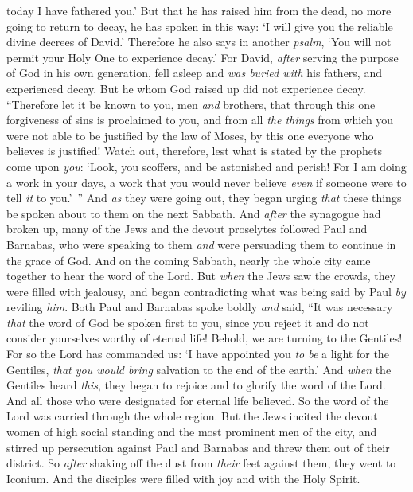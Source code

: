 \begin{biblechapter}
today I have fathered you.’
\verse But that he has raised him from the dead, no more going to return to decay, he has spoken in this way: ‘I will give you the reliable divine decrees of David.’
\verse Therefore he also says in another \textit{psalm}, ‘You will not permit your Holy One to experience decay.’
\verse For David, \textit{after} serving the purpose of God in his own generation, fell asleep and \textit{was buried with} his fathers, and experienced decay.
\verse But he whom God raised up did not experience decay.
\verse “Therefore let it be known to you, men \textit{and} brothers, that through this one forgiveness of sins is proclaimed to you, and from all \textit{the things} from which you were not able to be justified by the law of Moses,
\verse by this one everyone who believes is justified!
\verse Watch out, therefore, lest what is stated by the prophets come upon \textit{you}:
\verse ‘Look, you scoffers, 
and be astonished and perish! 
For I am doing a work in your days, 
a work that you would never believe 
\textit{even} if someone were to tell \textit{it} to you.’ ”
 And \textit{as} they were going out, they began urging \textit{that} these things be spoken about to them on the next Sabbath.
\verse And \textit{after} the synagogue had broken up, many of the Jews and the devout proselytes followed Paul and Barnabas, who were speaking to them \textit{and} were persuading them to continue in the grace of God.
\verse And on the coming Sabbath, nearly the whole city came together to hear the word of the Lord.
\verse But \textit{when} the Jews saw the crowds, they were filled with jealousy, and began contradicting what was being said by Paul \textit{by} reviling \textit{him}.
\verse Both Paul and Barnabas spoke boldly \textit{and} said, “It was necessary \textit{that} the word of God be spoken first to you, since you reject it and do not consider yourselves worthy of eternal life! Behold, we are turning to the Gentiles!
\verse For so the Lord has commanded us: ‘I have appointed you \textit{to be} a light for the Gentiles, 
\textit{that you would bring} salvation to the end of the earth.’
\verse And \textit{when} the Gentiles heard \textit{this}, they began to rejoice and to glorify the word of the Lord. And all those who were designated for eternal life believed.
\verse So the word of the Lord was carried through the whole region.
\verse But the Jews incited the devout women of high social standing and the most prominent men of the city, and stirred up persecution against Paul and Barnabas and threw them out of their district.
\verse So \textit{after} shaking off the dust from \textit{their} feet against them, they went to Iconium.
\verse And the disciples were filled with joy and with the Holy Spirit.
\end{biblechapter}

